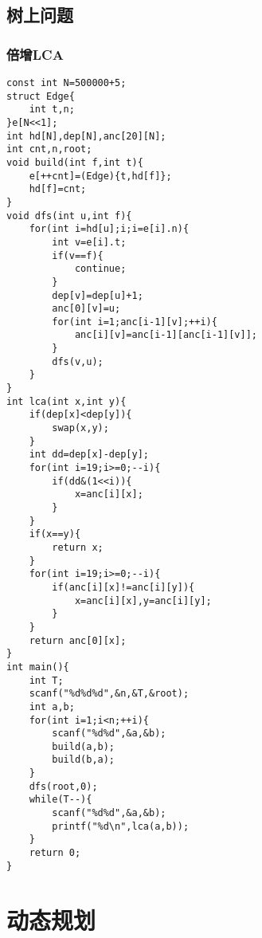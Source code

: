 \documentclass[UTF8]{ctexart}
\begin{document}
\subsection{树上问题}
\subsubsection{倍增LCA}
\begin{lstlisting}
const int N=500000+5;
struct Edge{
    int t,n;
}e[N<<1];
int hd[N],dep[N],anc[20][N];
int cnt,n,root;
void build(int f,int t){
    e[++cnt]=(Edge){t,hd[f]};
    hd[f]=cnt;
}
void dfs(int u,int f){
    for(int i=hd[u];i;i=e[i].n){
        int v=e[i].t;
        if(v==f){
            continue;
        }
        dep[v]=dep[u]+1;
        anc[0][v]=u;
        for(int i=1;anc[i-1][v];++i){
            anc[i][v]=anc[i-1][anc[i-1][v]];
        }
        dfs(v,u);
    }
}
int lca(int x,int y){
    if(dep[x]<dep[y]){
        swap(x,y);
    }
    int dd=dep[x]-dep[y];
    for(int i=19;i>=0;--i){
        if(dd&(1<<i)){
            x=anc[i][x];
        }
    }
    if(x==y){
        return x;
    }
    for(int i=19;i>=0;--i){
        if(anc[i][x]!=anc[i][y]){
            x=anc[i][x],y=anc[i][y];
        }
    }
    return anc[0][x];
}
int main(){
    int T;
    scanf("%d%d%d",&n,&T,&root);
    int a,b;
    for(int i=1;i<n;++i){
        scanf("%d%d",&a,&b);
        build(a,b);
        build(b,a);
    }
    dfs(root,0);
    while(T--){
        scanf("%d%d",&a,&b);
        printf("%d\n",lca(a,b));
    }
    return 0;
} 
\end{lstlisting}
\section{动态规划}
\end{document}
